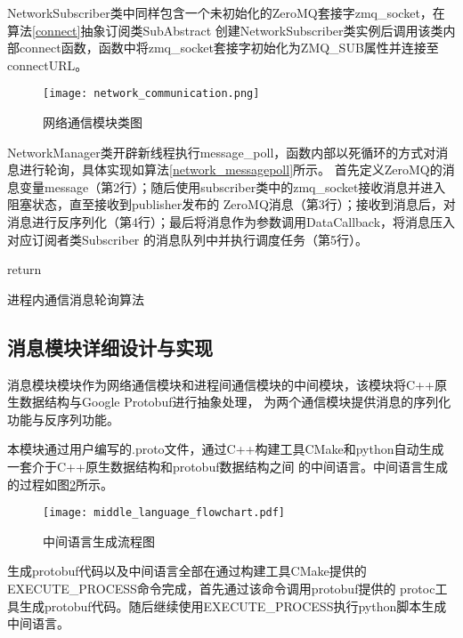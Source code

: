 NetworkSubscriber类中同样包含一个未初始化的ZeroMQ套接字zmq\_socket，在算法\ref{connect}抽象订阅类SubAbstract
创建NetworkSubscriber类实例后调用该类内部connect函数，函数中将zmq\_socket套接字初始化为ZMQ\_SUB属性并连接至connectURL。
\begin{figure}[H]
  \centering
  \texttt{[image: network\_communication.png]}
  \caption{网络通信模块类图}
  \label{network_communication}
\end{figure}
NetworkManager类开辟新线程执行message\_poll，函数内部以死循环的方式对消息进行轮询，具体实现如算法\ref{network_messagepoll}所示。
首先定义ZeroMQ的消息变量message（第2行）；随后使用subscriber类中的zmq\_socket接收消息并进入阻塞状态，直至接收到publisher发布的
ZeroMQ消息（第3行）；接收到消息后，对消息进行反序列化（第4行）；最后将消息作为参数调用DataCallback，将消息压入对应订阅者类Subscriber
的消息队列中并执行调度任务（第5行）。
\begin{algorithm}
  \small
  \SetAlgoLined
  return 
  \caption{进程内通信消息轮询算法}
  \label{network_messagepoll}
\end{algorithm}

\subsection{消息模块详细设计与实现}
消息模块模块作为网络通信模块和进程间通信模块的中间模块，该模块将C++原生数据结构与Google Protobuf进行抽象处理，
为两个通信模块提供消息的序列化功能与反序列功能。

本模块通过用户编写的.proto文件，通过C++构建工具CMake和python自动生成一套介于C++原生数据结构和protobuf数据结构之间
的中间语言。中间语言生成的过程如图\ref{middle_language_flowchart}所示。
\begin{figure}[H]
  \centering
  \texttt{[image: middle\_language\_flowchart.pdf]}
  \caption{中间语言生成流程图}
  \label{middle_language_flowchart}
\end{figure}
生成protobuf代码以及中间语言全部在通过构建工具CMake提供的EXECUTE\_PROCESS命令完成，首先通过该命令调用protobuf提供的
protoc工具生成protobuf代码。随后继续使用EXECUTE\_PROCESS执行python脚本生成中间语言。

